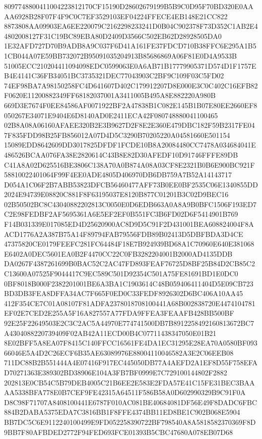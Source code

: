 \documentclass[UTF8,fontset=fandol,zihao=-4,a4paper]{ctexart}
\begin{document}
{{8097748800411004223812170CF15190D28602679199B5B9C0D95F70BD320E0AAAA6928B28F07F4F9C0C7EF3529103EF04224FFECE4EB148E21CC822
8873808AA09903EA6EE220079C2162298233241D0B04C902378F73D352C1AB2E44802008127F31C19BC89EBA80D2409D3566C502EB62D28928505DA0
1E32AFD727D70B9ADB8A9C037F6D41A161FE37FDCD710B38FFC6E295A1B51CB044A07E59BB732072B95091035204913B85686869A06F81E0D4A9533B
51005ECC210204411094098EDC0599063E0A6AB71B17779905371D574D1F1757EB4E4141C36FB34051BC3735321DEC77043903C2BF9C109F03C5FD02
74EF98BA7A98150258FC4D641607D402C179912207D8E000E3C0C402C16EFB82F0620E11200882349FF68182037001A3411005B495A8E882220A980B
669D3E7674F0EE84586AF0071922BF2A47838B1C082E145B1B07E80EE2660EF8050267E34071E9404E6D8140AD0E2411ECA42F080748880041100465
02B8A08A06160AFAEE320B2E3B9627D2F8E2E360E479DBC182F59B2317FE047F835FDD98B25FB856012A07D4D5C3290B70205220A04581660E501154
15089EDD8642609DD3017825DFDF1FCDE10B8A20084480CC7478A034684041E486526BCAA076FA38E2820614C43B8E82D30AFEDF10D91746FFFE89DB
C41A8A02D625516BE3806C138A70A0B874A08A03CF8E2321B0B6E900BC921F58810022401064F99F4EE0ADE4805D406970DB6DB759A7B52A14143717
D054A1C06F2B7ABB53823DFCB56460477AFF73B0EE0BF2535C06E1340855DD2024E94739E08820C881F8F63195037E8120B877C01201B3C02D9BEC16
02B50502BC8C43040882202813C0050E0D6EDB663A0A8A9B0BFC1506F193ED7C2E98FEDBF2AF5695361A6E5EF2EF0B551FC3B6FD02D6F5414901B769
F14B031339E017085ED4D25620900AC8D9D5C91F2D431001BEA608824004F8AACD1776A2A387B75A14F89794FAB79556FDB89B02413D5DBFBDA3D4CE
47375820CE0179FEEFC281FC64484F18E7B924939BD68A1C70960E640E381068E6402A0DEC5601EA0B2F4470CC22C0FB3282204001B2000AD4135DDB
DA0267F4387261699B0BAC52C2AC47FD893FEAF76725D8BF25B84D2CB85C2C13600A07525F9044417C9EC589C501D92354C501A75FE81691BD1E0DC0
0BF8018B000F2382201001BE6A3BA1C1903614C48B059406411404D5E09CB723BD3DB3FEA8DFFA34AC7F665F0ED0C33FEDF8926302D6BC406A10AA45
412F354CE7C01A08107F81ADFA2378018708100441A68B002838720E4474104781EF02E7CED2E255A5F16A827557A77FDA9FFEA3FEAAFB428BB500BF
92E25F22649503E2C3C2AC5A44970E774741500DB7B8912258492160813672BC7A4304088220739409F02AB42A11ECD00B4C07711438347050E01B21
8E02BFF5A8EA07F8415C140FFCC16561FE4DA1EC31295E28EA70A0580BF09366046E5A4D2C26ECF6B35AE63089976E88004110046582A3E2C06EEB08
711DC88B2B551444A4E07416F917EC445050DB77A4AEFD2A1EF8D55F758EFAD70271363E389302BD38906E104A3FB7BF0999E7C729100144802F2882
202813E0CB54C5B79DEB4005C21B6EE2E583E2FDA57E41C15FE31BEC3BAAAA5338BFA778E0B7CEF9FE42315A64511F586B58A0D602990329B9C91F0A
D8C98F71707A8408100441E6787F010AC081BE40684081DF56E49F8DADC6FBC884B2DABA5375EDA7C3816BB1F8FFE4374BB11ED8BE1C902B068E5904
BB7DC5C6E9112240100499E9FD052258390722BF798540A8A5818582370369F8D9BB7F80AFBDED2772F94FED693FCE01393B5CBC47680A078EB07D68
}}
\end{document}
